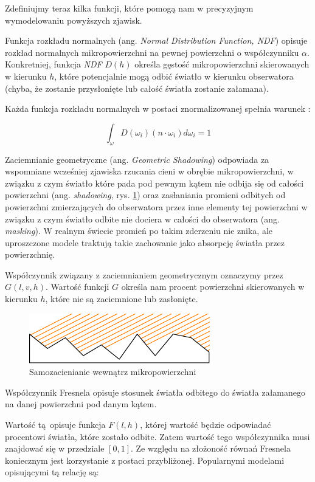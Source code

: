 \documentclass[../main.tex]{subfiles}
\begin{document}
Zdefiniujmy teraz kilka funkcji, które pomogą nam w precyzyjnym wymodelowaniu
powyższych zjawisk.

Funkcja rozkładu normalnych (ang. \textit{Normal Distribution Function, NDF})
opisuje rozkład normalnych mikropowierzchni na pewnej powierzchni o
współczynniku $\alpha$. Konkretniej, funkcja \textit{NDF} $D(h)$ określa
gęstość mikropowierzchni skierowanych w kierunku $h$, które potencjalnie mogą
odbić światło w kierunku obserwatora (chyba, że zostanie przysłonięte lub
całość światła zostanie załamana).

Każda funkcja rozkładu normalnych w postaci znormalizowanej spełnia warunek
\cite{NDFReed}:

\[
  \int_{\omega} {
    D(\omega_i)
    (n \cdot \omega_i)
    d \omega_i
  } = 1
\]

Zaciemnianie geometryczne (ang. \textit{Geometric Shadowing}) odpowiada za
wspomniane wcześniej zjawiska rzucania cieni w obrębie mikropowierzchni, w
związku z czym światło które pada pod pewnym kątem nie odbija się od całości
powierzchni (ang. \textit{shadowing}, rys. \ref{fig:GeometricShadowing}) oraz
zasłaniania promieni odbitych od powierzchni zmierzających do obserwatora przez
inne elementy tej powierzchni w związku z czym światło odbite nie dociera w
całości do obserwatora (ang. \textit{masking}). W realnym świecie promień po
takim zderzeniu nie znika, ale uproszczone modele traktują takie zachowanie
jako absorpcję światła przez powierzchnię.

Współczynnik związany z zaciemnianiem geometrycznym oznaczymy przez $G(l,v,h)$.
Wartość funkcji $G$ określa nam procent powierzchni skierowanych w kierunku
$h$, które nie są zaciemnione lub zasłonięte.

\begin{figure}[h]
  \centering
  \includegraphics{illustrations/pbr/geometry_shadowing.pdf}
  \vspace{0.25cm}
  \caption{Samozacienianie wewnątrz mikropowierzchni}
	\label{fig:GeometricShadowing}
\end{figure}

Współczynnik Fresnela opisuje stosunek światła odbitego do światła załamanego
na danej powierzchni pod danym kątem.

Wartość tą opisuje funkcja $F(l,h)$, której wartość będzie odpowiadać
procentowi światła, które zostało odbite. Zatem wartość tego współczynnika musi
znajdować się w przedziale $[0,1]$. Ze względu na złożoność równań Fresnela
koniecznym jest korzystanie z postaci przybliżonej. Popularnymi modelami
opisującymi tą relację są:
\end{document}
